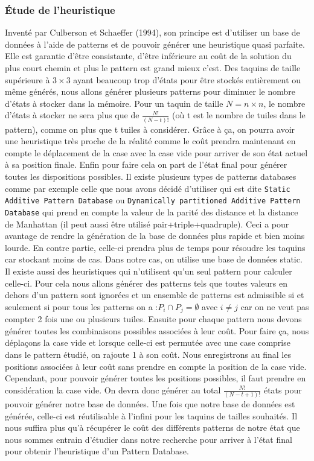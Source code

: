 \documentclass[a4paper, 12pt]{article}
\begin{document}
\subsubsection{Étude de l'heuristique}

Inventé par Culberson et Schaeffer (1994), son principe est d'utiliser un base de données à l'aide de patterns et de pouvoir générer une heuristique quasi parfaite. Elle est garantie d'être consistante, d'être inférieure au coût de la solution du plus court chemin et plus le pattern est grand mieux c'est. Des taquins de taille supérieure à $3 \times 3$ ayant beaucoup trop d'états pour être stockés entièrement ou même générés, nous allons générer plusieurs patterns pour diminuer le nombre d'états à stocker dans la mémoire. 
Pour un taquin de taille $N = n \times n$, le nombre d'états à stocker ne sera plus que de $\frac{N!}{(N-t)!}$ (où t est le nombre de tuiles dans le pattern), comme on plus que t tuiles à considérer. Grâce à ça, on pourra avoir une heuristique très proche de la réalité comme le coût prendra maintenant en compte le déplacement de la case avec la case vide pour arriver de son état actuel à sa position finale. 
Enfin pour faire cela on part de l'état final pour générer toutes les dispositions possibles.
Il existe plusieurs types de patterns databases comme par exemple celle que nous avons décidé d'utiliser qui est dite \lstinline{Static Additive Pattern Database} ou \lstinline{Dynamically partitioned Additive Pattern Database} qui prend en compte la valeur de la parité des distance et la distance de Manhattan (il peut aussi être utilisé pair+triple+quadruple). Ceci a pour avantage de rendre la génération de la base de données plus rapide et bien moins lourde. 
En contre partie, celle-ci prendra plus de temps pour résoudre les taquins car stockant moins de cas. Dans notre cas, on utilise une base de données static. Il existe aussi des heuristiques qui n'utilisent qu'un seul pattern pour calculer celle-ci. 
Pour cela nous allons générer des patterns tels que toutes valeurs en dehors d'un pattern sont ignorées et un ensemble de patterns est admissible si et seulement si pour tous les patterns on a :$P_{i} \cap P_{j} = \emptyset$ avec $i \neq j$ car on ne veut pas compter 2 fois une ou plusieurs tuiles. Ensuite pour chaque pattern nous devons générer toutes les combinaisons possibles associées à leur coût. Pour faire ça, nous déplaçons la case vide et lorsque celle-ci est permutée avec une case comprise dans le pattern étudié, on rajoute 1 à son coût. 
Nous enregistrons au final les positions associées à leur coût sans prendre en compte la position de la case vide. Cependant, pour pouvoir générer toutes les positions possibles, il faut prendre en considération la case vide. On devra donc générer au total $\frac{N!}{(N-t+1)!}$ états pour pouvoir générer notre base de données.
Une fois que notre base de données est générée, celle-ci est réutilisable à l'infini pour les taquins de tailles souhaités. Il nous suffira plus qu'à récupérer le coût des différents patterns de notre état que nous sommes entrain d'étudier dans notre recherche pour arriver à l'état final pour obtenir l'heuristique d'un Pattern Database.
\end{document}
